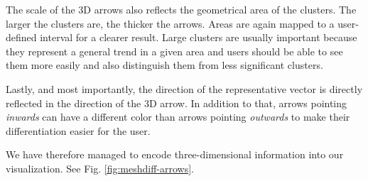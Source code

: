 The scale of the 3D arrows also reflects the geometrical area of the clusters. The larger the clusters are, the thicker the arrows. Areas are again mapped to a user-defined interval for a clearer result. Large clusters are usually important because they represent a general trend in a given area and users should be able to see them more easily and also distinguish them from less significant clusters.

Lastly, and most importantly, the direction of the representative vector is directly reflected in the direction of the 3D arrow. In addition to that, arrows pointing {\it inwards} can have a different color than arrows pointing {\it outwards} to make their differentiation easier for the user.

We have therefore managed to encode three-dimensional information into our visualization. See Fig. \ref{fig:meshdiff-arrows}.

